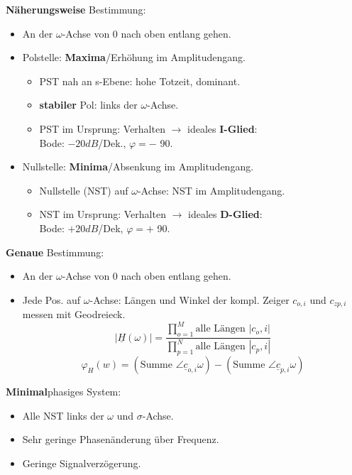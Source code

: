 \textbf{Näherungsweise} Bestimmung:
\begin{itemize}
\item An der $\omega$-Achse von 0 nach oben entlang gehen.
\item Polstelle: \textbf{Maxima}/Erhöhung im Amplitudengang.
\begin{itemize}
	\item PST nah an s-Ebene: hohe Totzeit, dominant.
	\item \textbf{stabiler} Pol: links der $\omega$-Achse.
	\item PST im Ursprung: Verhalten $\rightarrow$ ideales \textbf{I-Glied}:\\ Bode: $-20dB$/Dek., $\varphi=-$ 90\textdegree.
\end{itemize}
\item Nullstelle: \textbf{Minima}/Absenkung im Amplitudengang.
\begin{itemize}
	\item Nullstelle (NST) auf $\omega$-Achse: NST im Amplitudengang.
	\item NST im Ursprung: Verhalten $\rightarrow$ ideales \textbf{D-Glied}:\\ Bode: $+20dB$/Dek, $ \varphi=+$ 90\textdegree.
\end{itemize}

\end{itemize}
\textbf{Genaue} Bestimmung:
\begin{itemize}
	\item An der $\omega$-Achse von 0 nach oben entlang gehen.
	\item Jede Pos. auf $\omega$-Achse: Längen und Winkel der kompl. Zeiger $c_{o,i}$ und $c_{zp,i}$ messen mit Geodreieck.
	\[
	|\underline{H}(\omega)|=\frac{\prod_{o=1}^{M}\text{alle Längen } |c_o,i|}{\prod_{p=1}^{N}\text{alle Längen } |c_p,i|}
	\]
	\[
	\varphi_H(w)=(\text{Summe } \angle \underline{c}_{o,i}{\omega})-(\text{Summe } \angle \underline{c}_{p,i}{\omega})
	\]
\end{itemize}
\textbf{Minimal}phasiges System:
\begin{itemize}
	\item Alle NST links der $\omega$ und $\sigma$-Achse.
	\item Sehr geringe Phasen\"anderung \"uber Frequenz.
	\item Geringe Signalverz\"ogerung.
\end{itemize}

\clearpage
